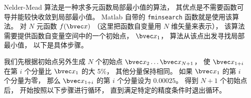 

Nelder-Mead 算法是一种求多元函数局部最小值的算法， 其优点是不需要函数可导并能较快收敛到局部最小值。 Matlab 自带的 \verb|fminsearch| 函数就是使用该算法。 对 $N$ 元函数 $f(\bvec x)$ （这里把函数自变量用 $N$ 维矢量来表示）， 该算法需要提供函数自变量空间中的一个初始点， $\bvec x_1$， 算法从该点出发寻找局部最小值， 以下是具体步骤。

我们先根据初始点另外生成 $N$ 个初始点 $\bvec x_2\dots\bvec x_{N + 1}$， 使 $\bvec x_{1 + i}$ 在第 $i$ 个分量比 $\bvec x_1$ 的大 5\%， 其他分量保持相同。 如果 $\bvec x_1$ 的第 $i$ 个分量为零， 那么 $\bvec x_{1 + i}$ 的第 $i$ 个分量设为 $0.00025$。 得到 $N+1$ 个初始点后， 开始按照以下步骤进行循环， 直到满足特定的精度条件时退出循环。


